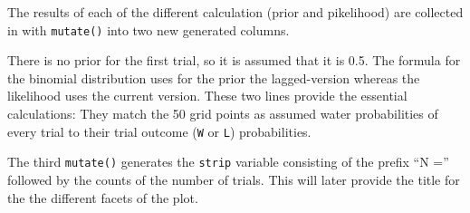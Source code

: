 \documentclass[
  letterpaper,
  DIV=11,
  numbers=noendperiod]{scrreprt}
\begin{document}
The results of each of the different calculation (prior and pikelihood)
are collected in with \texttt{mutate()} into two new generated columns.

There is no prior for the first trial, so it is assumed that it is 0.5.
The formula for the binomial distribution uses for the prior the
lagged-version whereas the likelihood uses the current version. These
two lines provide the essential calculations: They match the 50 grid
points as assumed water probabilities of every trial to their trial
outcome (\texttt{W} or \texttt{L}) probabilities.

The third \texttt{mutate()} generates the \texttt{strip} variable
consisting of the prefix ``N ='' followed by the counts of the number of
trials. This will later provide the title for the the different facets
of the plot.
\end{document}
